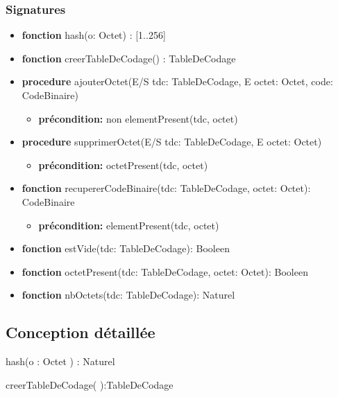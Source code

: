     \subsubsection*{Signatures}
	\begin{itemize}[label=$\ $, leftmargin=1cm]
		\item \textbf{fonction} hash(o: Octet) : [1..256]
		\item \textbf{fonction} creerTableDeCodage() : TableDeCodage
		\item \textbf{procedure} ajouterOctet(E/S tdc: TableDeCodage, E octet: Octet, code: CodeBinaire)
		\begin{itemize}[label=$| $]
			\item \textbf{précondition:} non elementPresent(tdc, octet)
		\end{itemize}
		\item \textbf{procedure} supprimerOctet(E/S tdc: TableDeCodage, E octet: Octet)
		\begin{itemize}[label=$| $]
			\item \textbf{précondition:} octetPresent(tdc, octet)
		\end{itemize}
		\item \textbf{fonction} recupererCodeBinaire(tdc: TableDeCodage, octet: Octet): CodeBinaire
		\begin{itemize}[label=$| $]
			\item \textbf{précondition:} elementPresent(tdc, octet)
		\end{itemize}
		\item \textbf{fonction} estVide(tdc: TableDeCodage): Booleen
		\item \textbf{fonction} octetPresent(tdc: TableDeCodage, octet: Octet): Booleen
		\item \textbf{fonction} nbOctets(tdc: TableDeCodage): Naturel
	\end{itemize}

    \subsection*{Conception détaillée}
    
    \begin{function}
        \SetAlgoLined
        \caption{hash(o : Octet ) :  Naturel} 
    \end{function}
    
    \begin{function}
        \SetAlgoLined
        \caption{creerTableDeCodage( ):TableDeCodage}
    \end{function}
        
